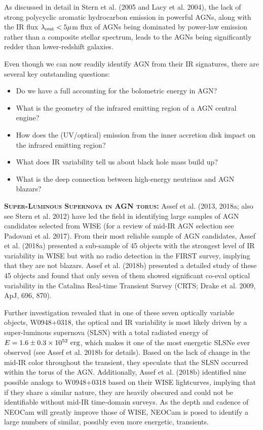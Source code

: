 \documentclass[12pt]{article}
\begin{document}
\smallskip
\smallskip
\noindent
As discussed in detail in Stern et al. (2005 and Lacy et al. 2004), the lack of strong
polycyclic aromatic hydrocarbon emission in powerful AGNs, along with
the IR flux $\lambda_{\rm rest} < 5 \mu$m flux of AGNs being dominated
by power-law emission rather than a composite stellar spectrum, leads
to the AGNs being significantly redder than lower-redshift galaxies.

\smallskip
\smallskip
\noindent
Even though we can now readily identify AGN from their IR signatures, 
there are several key outstanding questions:  

\begin{itemize}
\item Do we have a full accounting for the bolometric energy in AGN?
\item What is the geometry of the infrared emitting region of a AGN central engine?
\item How does the (UV/optical) emission from the inner accretion disk impact on the infrared emitting region?
\item What does IR variability tell us about black hole mass build up?
\item What is the deep connection between high-energy neutrinos and AGN blazars? 
\end{itemize}


\smallskip
\smallskip
\noindent
\textbf{\textsc{Super-Luminous Supernova in AGN torus: }} 
Assef et al. (2013, 2018a; also see Stern et al. 2012) have led the field in identifying large samples of AGN candidates selected from WISE (for a review of mid-IR AGN selection see Padovani et al. 2017). From their most reliable sample of AGN candidates, Assef et al. (2018a) presented a sub-sample of 45 objects with the strongest level of IR variability in WISE but with no radio detection in the FIRST survey, implying that they are not blazars. Assef et al. (2018b) presented a detailed study of these 45 objects and found that only seven of them showed significant co-eval optical variability in the Catalina Real-time Transient Survey (CRTS; Drake et al. 2009, ApJ, 696, 870).

\smallskip
\smallskip
\noindent
Further investigation revealed that in one of these seven optically variable objects, W0948+0318, the optical and IR variability is most likely driven by a super-luminous supernova (SLSN) with a total radiated energy of $E=1.6\pm 0.3 \times 10^{52}~\rm erg$, which makes it one of the most energetic SLSNe ever observed (see Assef et al. 2018b for details). Based on the lack of change in the mid-IR color throughout the transient, they speculate that the SLSN occurred within the torus of the AGN. Additionally, Assef et al. (2018b) identified nine possible analogs to W0948+0318 based on their WISE lightcurves, implying that if they share a similar nature, they are heavily obscured and could not be identifiable without mid-IR time-domain surveys. As the depth and cadence of NEOCam will greatly improve those of WISE, NEOCam is posed to identify a large numbers of similar, possibly even more energetic, transients.
\end{document}
